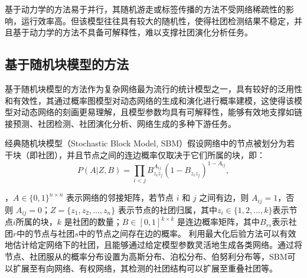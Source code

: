 基于动力学的方法易于并行，其随机游走或标签传播的方法不受网络稀疏性的影响，运行效率高。但该模型往往具有较大的随机性，使得社团检测结果不稳定，并且基于动力学的方法不具备可解释性，难以支撑社团演化分析任务。

\subsection{基于随机块模型的方法}

基于随机块模型的方法作为复杂网络最为流行的统计模型之一\cite{karrer2011stochastic}，具有较好的泛用性和有效性，其通过概率图模型对动态网络的生成和演化进行概率建模，这使得该模型对动态网络的刻画更易理解，且模型参数均具有可解释性，能够有效地支撑如链接预测、社团检测、社团演化分析、网络生成的多种下游任务。

经典随机块模型（Stochastic Block Model, SBM）假设网络中的节点被划分为若干块（即社团），并且节点之间的连边概率仅取决于它们所属的块，即：
\[
P(A | Z, B) = \prod_{i < j} B_{z_i z_j}^{A_{ij}} (1 - B_{z_i z_j})^{1 - A_{ij}},
\]

，\( A \in \{0, 1\}^{n \times n} \) 表示网络的邻接矩阵，若节点 \( i \) 和 \( j \) 之间有边，则 \( A_{ij} = 1 \)，否则 \( A_{ij} = 0 \)；\( Z = \{z_1, z_2, \dots, z_n\} \) 表示节点的社团归属，其中\( z_i \in \{1, 2, \dots, k\} \)表示节点\( i \)所属的块，\( k \) 是社团的数量；\( B \in [0, 1]^{k \times k} \) 是连边概率矩阵，其中\( B_{rs} \)表示社团\( r \)中的节点与社团\( s \)中的节点之间存在边的概率。
利用最大化后验方法可以有效地估计给定网络下的社团，且能够通过给定模型参数灵活地生成各类网络。通过将节点、社团服从的概率分布设置为高斯分布、泊松分布、伯努利分布等，SBM可以扩展至有向网络、有权网络，其检测的社团结构可以扩展至重叠社团等。

